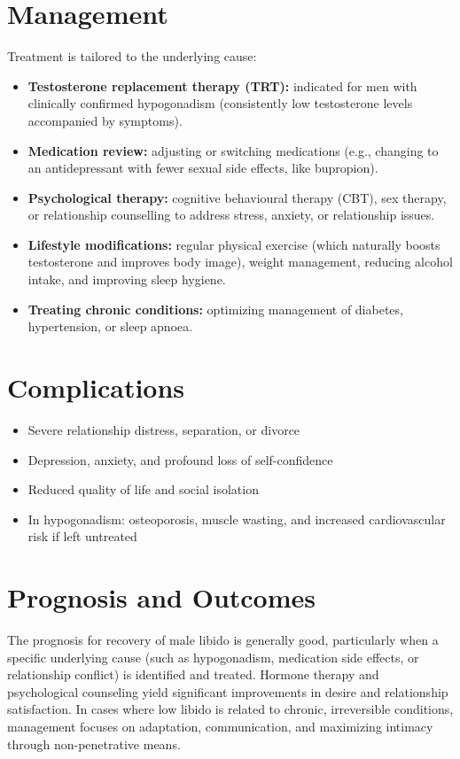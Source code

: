 \section*{Management}
Treatment is tailored to the underlying cause:

\begin{itemize}
    \item \textbf{Testosterone replacement therapy (TRT):} indicated for men with clinically confirmed hypogonadism (consistently low testosterone levels accompanied by symptoms).
    \item \textbf{Medication review:} adjusting or switching medications (e.g., changing to an antidepressant with fewer sexual side effects, like bupropion).
    \item \textbf{Psychological therapy:} cognitive behavioural therapy (CBT), sex therapy, or relationship counselling to address stress, anxiety, or relationship issues.
    \item \textbf{Lifestyle modifications:} regular physical exercise (which naturally boosts testosterone and improves body image), weight management, reducing alcohol intake, and improving sleep hygiene.
    \item \textbf{Treating chronic conditions:} optimizing management of diabetes, hypertension, or sleep apnoea.
\end{itemize}

\section*{Complications}
\begin{itemize}
    \item Severe relationship distress, separation, or divorce
    \item Depression, anxiety, and profound loss of self-confidence
    \item Reduced quality of life and social isolation
    \item In hypogonadism: osteoporosis, muscle wasting, and increased cardiovascular risk if left untreated
\end{itemize}

\section*{Prognosis and Outcomes}
The prognosis for recovery of male libido is generally good, particularly when a specific underlying cause (such as hypogonadism, medication side effects, or relationship conflict) is identified and treated. Hormone therapy and psychological counseling yield significant improvements in desire and relationship satisfaction. In cases where low libido is related to chronic, irreversible conditions, management focuses on adaptation, communication, and maximizing intimacy through non-penetrative means.

